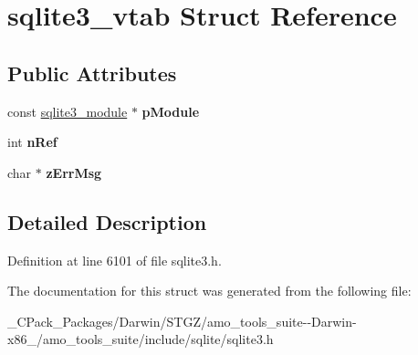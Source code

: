 \hypertarget{structsqlite3__vtab}{}\section{sqlite3\+\_\+vtab Struct Reference}
\label{structsqlite3__vtab}
\subsection*{Public Attributes}
\begin{DoxyCompactItemize}
\item 
\mbox{\label{structsqlite3__vtab_acf0d906e36b113669eaa883c5f8b5ba0}} 
const \hyperlink{structsqlite3__module}{sqlite3\+\_\+module} $\ast$ {\bfseries p\+Module}
\item 
\mbox{\label{structsqlite3__vtab_ab3c80d385849bdd82363a0df7d6fcba8}} 
int {\bfseries n\+Ref}
\item 
\mbox{\label{structsqlite3__vtab_a47331586775d674ae951b07ebb902fca}} 
char $\ast$ {\bfseries z\+Err\+Msg}
\end{DoxyCompactItemize}


\subsection{Detailed Description}


Definition at line 6101 of file sqlite3.\+h.



The documentation for this struct was generated from the following file\+:\begin{DoxyCompactItemize}
\item 
\+\_\+\+C\+Pack\+\_\+\+Packages/\+Darwin/\+S\+T\+G\+Z/amo\+\_\+tools\+\_\+suite-\/-\/\+Darwin-\/x86\+\_/amo\+\_\+tools\+\_\+suite/include/sqlite/sqlite3.\+h\end{DoxyCompactItemize}
